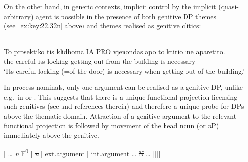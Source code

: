 \documentclass[output=paper]{langsci/langscibook}
\begin{document}
\ea%
    \label{ex:key:22.40}
    \z
\z

On the other hand, in generic contexts, implicit control by the implicit
(quasi-arbitrary) agent is possible in the presence of both genitive DP themes
(see~\eqref{ex:key:22.32n} above) and themes realised as genitive clitics:

\ea%
    \label{ex:key:22.41n} \\
    \gll    To prosektiko tis klidhoma IA PRO vjenondas apo to ktirio ine aparetito.\\
            the careful its locking {} {} getting-out from the building is necessary\\
	\glt    \enquote*{Its careful locking (=of the door) is necessary when getting out of the building.}
\z

In  process nominals, only one argument can be realised as a genitive DP,
unlike e.g.\ in  or . This suggests that there is a
unique functional projection licensing such genitives (see
\citealt{AleHaeSta2007} and references therein) and therefore a unique probe
for DPs above the thematic domain. Attraction of a genitive argument to the
relevant functional projection is followed by movement of the head noun (or
\emph{n}P) immediately above the genitive.

\ea%
    \label{ex:key:22.41}
    {}[ \dots{}\tss{} \emph{n} F\tss{\Gen{}}\textsuperscript{0}
        [ \sout{\emph{n}}
            [  ext.argument [ int.argument \dots{} \sout{N} \dots{} ]]]]
\z
\end{document}

